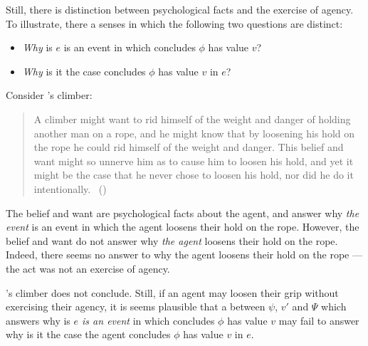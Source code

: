
\begin{note}
  Still, there is distinction between psychological facts and the exercise of agency.
  To illustrate, there a senses in which the following two questions are distinct:

  \begin{itemize}
  \item
    \emph{Why} is \(e\) is an event in which \vAgent{} concludes \(\phi\) has value \(v\)?
  \item
    \emph{Why} is it the case \vAgent{} concludes \(\phi\) has value \(v\) in \(e\)?
  \end{itemize}

  Consider \citeauthor{Davidson:1973vd}'s climber:
  \begin{quote}
    A climber might want to rid himself of the weight and danger of holding another man on a rope, and he might know that by loosening his hold on the rope he could rid himself of the weight and danger.
    This belief and want might so unnerve him as to cause him to loosen his hold, and yet it might be the case that he never chose to loosen his hold, nor did he do it intentionally.%
    \mbox{ }\hfill\mbox{(\citeauthor[79]{Davidson:1973vd})}
  \end{quote}
  The \agents{} belief and want are psychological facts about the agent, and answer why \emph{the event} is an event in which the agent loosens their hold on the rope.
  However, the \agents{} belief and want do not answer why \emph{the agent} loosens their hold on the rope.
  Indeed, there seems no answer to why the agent loosens their hold on the rope --- the act was not an exercise of agency.

  \citeauthor{Davidson:1973vd}'s climber does not conclude.
  Still, if an agent may loosen their grip without exercising their agency, it is seems plausible that a \ros{} between \(\psi\), \(v'\) and \(\Psi\) which answers why is \emph{\(e\) is an event} in which \vAgent{} concludes \(\phi\) has value \(v\) may fail to answer why is it the case the agent concludes \(\phi\) has value \(v\) in \(e\).


\end{note}
